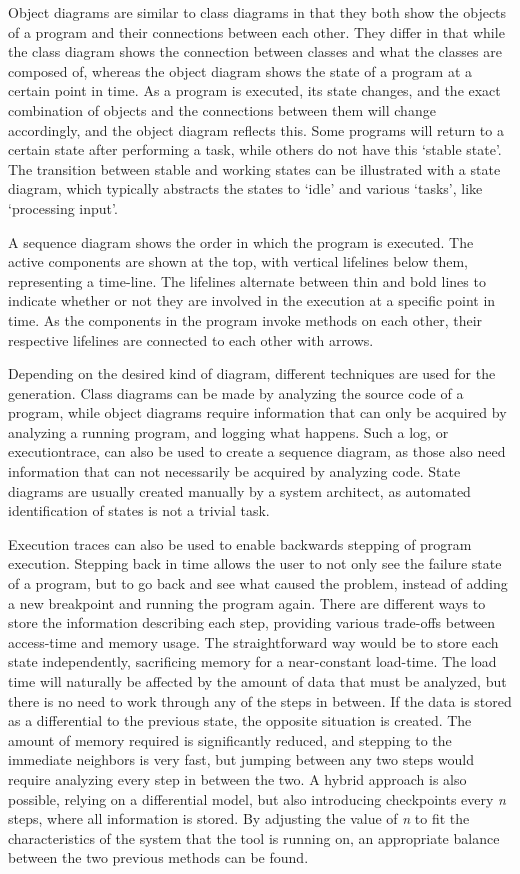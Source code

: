 Object diagrams are similar to class diagrams in that they both show the objects of a program and their connections between each other.
They differ in that while the class diagram shows the connection between classes and what the classes are composed of, whereas the object diagram shows the state of a program at a certain point in time.
As a program is executed, its state changes, and the exact combination of objects and the connections between them will change accordingly, and the object diagram reflects this.
Some programs will return to a certain state after performing a task, while others do not have this `stable state'.
The transition between stable and working states can be illustrated with a state diagram, which typically abstracts the states to `idle' and various `tasks', like `processing input'.

A sequence diagram shows the order in which the program is executed.
The active components are shown at the top, with vertical \glspl{lifeline} below them, representing a time-line.
The lifelines alternate between thin and bold lines to indicate whether or not they are involved in the execution at a specific point in time.
As the components in the program invoke methods on each other, their respective lifelines are connected to each other with arrows.

Depending on the desired kind of diagram, different techniques are used for the generation.
Class diagrams can be made by analyzing the source code of a program, while object diagrams require information that can only be acquired by analyzing a running program, and logging what happens.
Such a log, or \gls{executiontrace}, can also be used to create a sequence diagram, as those also need information that can not necessarily be acquired by analyzing code.
State diagrams are usually created manually by a system architect, as automated identification of states is not a trivial task.

Execution traces can also be used to enable backwards stepping of program execution.
Stepping back in time allows the user to not only see the failure state of a program, but to go back and see what caused the problem, instead of adding a new \gls{breakpoint} and running the program again.
There are different ways to store the information describing each step, providing various trade-offs between access-time and memory usage.
The straightforward way would be to store each state independently, sacrificing memory for a near-constant load-time.
The load time will naturally be affected by the amount of data that must be analyzed, but there is no need to work through any of the steps in between.
If the data is stored as a differential to the previous state, the opposite situation is created.
The amount of memory required is significantly reduced, and stepping to the immediate neighbors is very fast, but jumping between any two steps would require analyzing every step in between the two.
A hybrid approach is also possible, relying on a differential model, but also introducing checkpoints every \textit{n} steps, where all information is stored.
By adjusting the value of \textit{n} to fit the characteristics of the system that the tool is running on, an appropriate balance between the two previous methods can be found.

